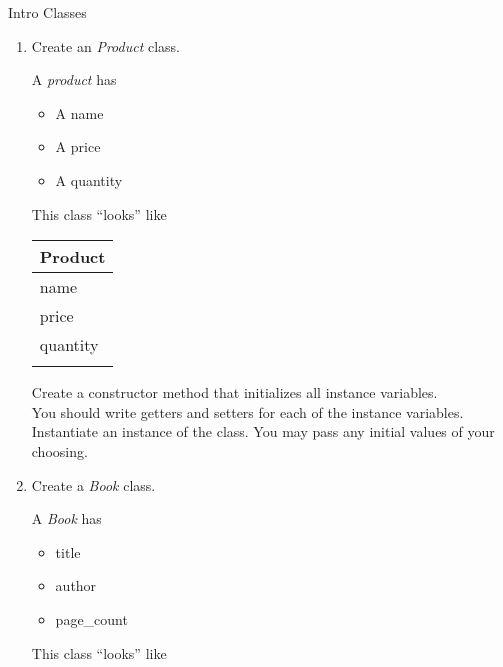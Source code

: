 \documentclass{article}
\begin{document}
\begin{flushright}
Intro Classes\end{flushright}

\vspace*{-1.5em}
\noindent\makebox[\linewidth]{\rule{\paperwidth}{0.4pt}}


\vspace*{2em}

\begin{enumerate}




	\item Create an \textit{Product} class.\\
	\begin{minipage}{.6\textwidth}
		
		A \textit{product} has
		\begin{itemize}
			\item A name
			\item A price
			\item A quantity	
		\end{itemize}
	\end{minipage} 
	\begin{minipage}{.4\textwidth}
		This class ``looks'' like 
				
		\vspace*{1em}
		\begin{tabular}{|l|}
			\hline Product\\ \hline
			name\\ price\\ quantity\\ \hline
			\\  \hline
		\end{tabular}
	\end{minipage}

	\vspace*{2ex}
	Create a constructor method that initializes all instance variables.\\
	You should write getters and setters for each of the instance variables.\\
	Instantiate an instance of the class. You may pass any initial values of your choosing.




	\item Create a \textit{Book} class.\\	
	\begin{minipage}{.6\textwidth}
		A \textit{Book} has
		\begin{itemize}
			\item title 
			\item author
			\item page\_count	
		\end{itemize}
	\end{minipage}
	\begin{minipage}{.4\textwidth}
		This class ``looks'' like 
				

\end{minipage}
\end{enumerate}
\end{document}
